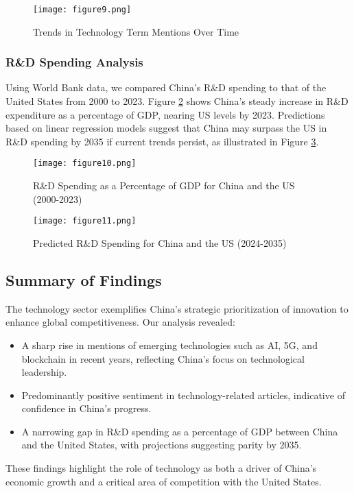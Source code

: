 \documentclass{article}
\begin{document}
\begin{figure}[H]
    \centering
    \texttt{[image: figure9.png]}
    \caption{Trends in Technology Term Mentions Over Time}
    \label{fig9}
\end{figure}

\subsubsection{R\&D Spending Analysis}

Using World Bank data, we compared China’s R\&D spending to that of the United States from 2000 to 2023. Figure \ref{fig10} shows China’s steady increase in R\&D expenditure as a percentage of GDP, nearing US levels by 2023. Predictions based on linear regression models suggest that China may surpass the US in R\&D spending by 2035 if current trends persist, as illustrated in Figure \ref{fig11}.

\begin{figure}[H]
    \centering
    \texttt{[image: figure10.png]}
    \caption{R\&D Spending as a Percentage of GDP for China and the US (2000-2023)}
    \label{fig10}
\end{figure}

\begin{figure}[H]
    \centering
    \texttt{[image: figure11.png]}
    \caption{Predicted R\&D Spending for China and the US (2024-2035)}
    \label{fig11}
\end{figure}

\subsection{Summary of Findings}

The technology sector exemplifies China’s strategic prioritization of innovation to enhance global competitiveness. Our analysis revealed:
\begin{itemize}
    \item A sharp rise in mentions of emerging technologies such as AI, 5G, and blockchain in recent years, reflecting China’s focus on technological leadership.
    \item Predominantly positive sentiment in technology-related articles, indicative of confidence in China’s progress.
    \item A narrowing gap in R\&D spending as a percentage of GDP between China and the United States, with projections suggesting parity by 2035.
\end{itemize}

These findings highlight the role of technology as both a driver of China’s economic growth and a critical area of competition with the United States.


\end{document}
